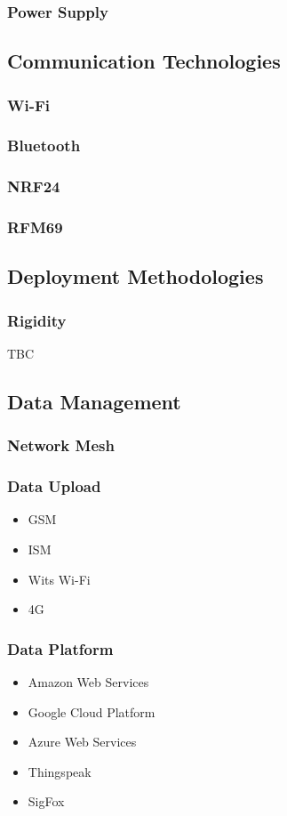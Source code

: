 \documentclass[10pt,twocolumn]{witseiepaper}
\begin{document}
		\subsubsection{Power Supply}
	
	\subsection{Communication Technologies}
		\subsubsection{Wi-Fi}
		\subsubsection{Bluetooth}
		\subsubsection{NRF24}
		\subsubsection{RFM69}
	
	\subsection{Deployment Methodologies}
		\subsubsection{Rigidity}
		TBC
	
	\subsection{Data Management}
		\subsubsection{Network Mesh}
		\subsubsection{Data Upload}
			\begin{itemize}
				\item GSM
				\item ISM
				\item Wits Wi-Fi
				\item 4G
			\end{itemize}
		\subsubsection{Data Platform}
			\begin{itemize}
				\item Amazon Web Services
				\item Google Cloud Platform
				\item Azure Web Services
				\item Thingspeak
				\item SigFox
			\end{itemize}
	
\end{document}
